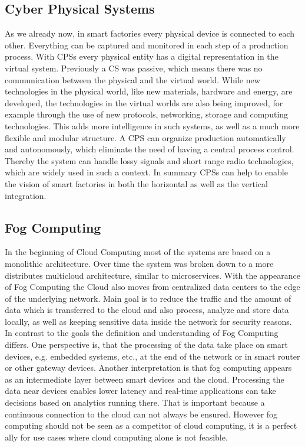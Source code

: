 \subsection{Cyber Physical Systems}
As we already now, in smart factories every physical device is connected to each other.
Everything can be captured and monitored in each step of a production process.
With \acp{CPS} every physical entity has a digital representation in the virtual system.\autocite[cf.][p. 1363]{Poovendran:2010}
Previously a \ac{CS} was passive, which means there was no communication between the physical and the virtual world.\autocite[cf.][p. 1364]{Poovendran:2010}
While new technologies in the physical world, like new materials, hardware and energy, are developed, the technologies in the virtual worlds are also being improved, for example through the use of new protocols, networking, storage and computing technologies.\autocite[cf.][p. 1364]{Poovendran:2010}
This adds more intelligence in such systems, as well as a much more flexible and modular structure.
A \ac{CPS} can organize production automatically and autonomously, which eliminate the need of having a central process control.\autocite[cf.]{Lom:2016}
Thereby the system can handle lossy signals and short range radio technologies, which are widely used in such a context.\autocite[cf.]{Yannuzzi:2014}
In summary \acp{CPS} can help to enable the vision of smart factories in both the horizontal as well as the vertical integration.


\subsection{Fog Computing}
In the beginning of Cloud Computing most of the systems are based on a monolithic architecture.
Over time the system was broken down to a more distributes multicloud architecture, similar to microservices.
With the appearance of Fog Computing the Cloud also moves from centralized data centers to the edge of the underlying network.
Main goal is to reduce the traffic and the amount of data which is transferred to the cloud and also process, analyze and store data locally, as well as keeping sensitive data inside the network for security reasons.\autocite[cf.][p. 236]{Brito:2016}\autocite[cf.][p. 325]{Yannuzzi:2014}\autocite[cf.][p. 4]{Lom:2016}
In contrast to the goals the definition and understanding of Fog Computing differs.
One perspective is, that the processing of the data take place on smart devices, e.g. embedded systems, etc., at the end of the network or in smart router or other gateway devices.\autocite[cf.][p. 4]{Lom:2016}
Another interpretation is that fog computing appears as an intermediate layer between smart devices and the cloud.\autocite[cf.][p. 236]{Brito:2016}
Processing the data near devices enables lower latency and real-time applications can take decisions based on analytics running there.
That is important because a continuous connection to the cloud can not always be ensured.
However fog computing should not be seen as a competitor of cloud computing, it is a perfect ally for use cases where cloud computing alone is not feasible.\autocite[cf.][p. 325]{Yannuzzi:2014}


